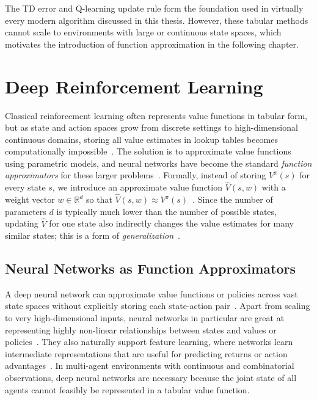 The TD error and Q-learning update rule form the foundation used in virtually every modern algorithm discussed in this thesis. However, these tabular methods cannot scale to environments with large or continuous state spaces, which motivates the introduction of function approximation in the following chapter.

\chapter{Deep Reinforcement Learning}
\label{chap:deep_rl}

Classical reinforcement learning often represents value functions in tabular form, but as state and action spaces grow from discrete settings to high-dimensional continuous domains, storing all value estimates in lookup tables becomes computationally impossible~\cite{sutton}. The solution is to approximate value functions using parametric models, and neural networks have become the standard \emph{function approximators} for these larger problems~\cite{spinningup2018}.
Formally, instead of storing $V^{\pi}(s)$ for every state $s$, we introduce an approximate value function $\hat V(s, w)$ with a weight vector $w \in \mathbb{R}^d$ so that $\hat{V}(s, w) \approx V^\pi(s)$~\cite{sutton}. Since the number of parameters $d$ is typically much lower than the number of possible states, updating $\hat{V}$ for one state also indirectly changes the value estimates for many similar states; this is a form of \emph{generalization}~\cite{sutton}.

\section{Neural Networks as Function Approximators}
A deep neural network can approximate value functions or policies across vast state spaces without explicitly storing each state-action pair~\cite{mnih2015human}. Apart from scaling to very high-dimensional inputs, neural networks in particular are great at representing highly non-linear relationships between states and values or policies~\cite{spinningup2018}. They also naturally support feature learning, where networks learn intermediate representations that are useful for predicting returns or action advantages~\cite{mnih2015human}. 
In multi-agent environments with continuous and combinatorial observations, deep neural networks are necessary because the joint state of all agents cannot feasibly be represented in a tabular value function.

